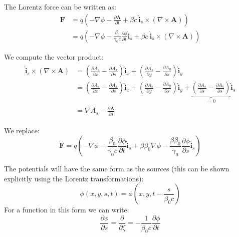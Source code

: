 The Lorentz force can be written as:
\begin{equation}
\begin{split}
\textbf{F} &=q \left( -\nabla \phi -\frac{\partial \textbf{A}}{\partial t}
 + \beta c \ \hat{\textbf{i}}_s \times {\left(\nabla \times \textbf{A} \right)} \right)\\
 &=q \left( -\nabla \phi -\frac{\beta_0}{\gamma_0 c}\frac{\partial \phi}{\partial t}\hat{\textbf{i}}_s
 + \beta c \ \hat{\textbf{i}}_s \times {\left(\nabla \times \textbf{A} \right)} \right)
 \end{split}
\end{equation}

We compute the vector product:
\begin{align}
\begin{split}
\hat{\textbf{i}}_s \times \left(\nabla \times \textbf{A}\right) &= \left(\frac{\partial A_s}{\partial x} - \frac{\partial A_x}{\partial s} \right) \hat{\textbf{i}}_x + \left(\frac{\partial A_s}{\partial y} - \frac{\partial A_y}{\partial s} \right) \hat{\textbf{i}}_y\\
 &= \left(\frac{\partial A_s}{\partial x} - \frac{\partial A_x}{\partial s} \right) \hat{\textbf{i}}_x + \left(\frac{\partial A_s}{\partial y} - \frac{\partial A_y}{\partial s} \right) \hat{\textbf{i}}_y + \underbrace{\left(\frac{\partial A_s}{\partial s} - \frac{\partial A_s}{\partial s} \right)}_{=0} \hat{\textbf{i}}_s\\
 &= \nabla A_s - \frac{\partial \textbf{A}}{\partial s} 
\end{split} 
\end{align}

We replace:
\begin{equation}
\textbf{F} 
=q \left( -\nabla \phi -\frac{\beta_0}{\gamma_0 c}\frac{\partial \phi}{\partial t}\hat{\textbf{i}}_s
 + \beta  \beta_0\nabla \phi - \frac{\beta \beta_0}{\gamma_0} \frac{\partial \phi}{\partial s} \hat{\textbf{i}}_s
  \right)
\end{equation}

The potentials will have the same form as the sources (this can be shown explicitly using the Lorentz transformations):
\begin{equation}
\phi(x, y, s, t) = \phi\left(x, y, t - \frac{s}{\beta_0 c}\right)
\end{equation}
For a function in this form we can write:
\begin{equation}
 \frac{\partial \phi}{\partial s} = 
\frac{\partial}{\partial\zeta} 
 = -\frac{1}{\beta_0 c}\frac{\partial \phi}{\partial t} \label{derder}
\end{equation}


